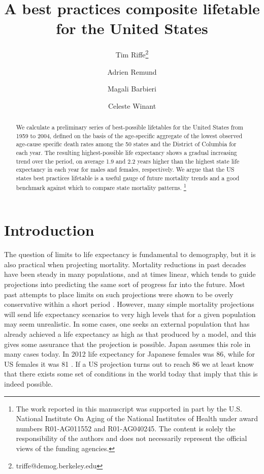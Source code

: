 \documentclass[11pt,oneside,a4paper]{article} %
\newcommand\ackn[1]{%
  \begingroup
  \renewcommand\thefootnote{}\footnote{#1}%
  \addtocounter{footnote}{-1}%
  \endgroup
}
\begin{document}
\title{A best practices composite lifetable for the United States}

\author[1]{Tim Riffe\thanks{triffe@demog.berkeley.edu}}
\author[2,3]{Adrien Remund}
\author[3,4]{Magali Barbieri}
\author[4]{Celeste Winant}


\maketitle

\begin{abstract}
We calculate a preliminary series of best-possible lifetables for the United
States from 1959 to 2004, defined on the basis of the age-specific aggregate of
the lowest observed age-cause specific death rates among the 50
states and the District of Columbia for each year. The resulting highest-possible life expectancy shows a gradual increasing trend over the period, on
average 1.9 and 2.2 years higher than the highest state life expectancy in each year for males and females, respectively. We argue that the US states best practices lifetable is a useful
gauge of future mortality trends and a good benchmark against which to compare
state mortality patterns.
\ackn{The work reported in this manuscript was supported in part by the U.S.
National Institute On Aging of the National Institutes of Health under award
numbers R01-AG011552 and R01-AG040245. The content is solely the responsibility of the authors and does not necessarily represent the official views of the funding agencies.}
\end{abstract}


\section*{Introduction}

The question of limits to life expectancy is fundamental to demography, but it
is also practical when projecting mortality. Mortality reductions in past
decades have been steady in many populations, and at times linear, which tends
to guide projections into predicting the same sort of progress far into the
future. Most past attempts to place limits on such projections were shown to be
overly conservative within a short period \citep{oeppen2002broken}.
However, many simple mortality projections will send life expectancy scenarios
to very high levels that for a given population may seem unrealistic. In some
cases, one seeks an external population that has already achieved a life
expectancy as high as that produced by a model, and this gives some assurance
that the projection is possible. Japan assumes this role in many cases today. In
2012 life expectancy for Japanese females was 86, while for US females it was 81
\citep{HMD}. If a US projection turns out to reach 86 we at least know that
there exists some set of conditions in the world today that imply that this is
indeed possible.
\end{document}
